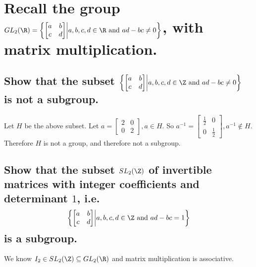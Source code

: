 \section[Problem 4]{
    Recall the group 
    \(
        GL_2(\R) =
        \left \{
        \begin{bmatrix}
            a & b \\
            c & d
        \end{bmatrix}
        \middle |
        a, b, c, d \in \R
        \text{ and }
        ad - bc \neq 0
        \right \}
    \),
    with matrix multiplication.
}
    \subsection[(i)]{
        Show that the subset 
        \(
            \left \{
            \begin{bmatrix}
                a & b \\
                c & d
            \end{bmatrix}
            \middle |
            a, b, c, d \in \Z
            \text{ and }
            ad - bc \neq 0
            \right \}
        \)
        is not a subgroup.
    }
        Let $H$ be the above subset.
        Let \(
            a = 
            \begin{bmatrix}
                2 & 0 \\
                0 & 2
            \end{bmatrix}
            , a \in H
        \).
        So \(
            a^{-1} = 
            \begin{bmatrix}
                \frac{1}{2} & 0 \\
                0 & \frac{1}{2}
            \end{bmatrix}
            , a^{-1} \not\in H
        \).
        Therefore $H$ is not a group, and therefore not a subgroup.

    \subsection[(ii)]{
        Show that the subset $SL_2(\Z)$
        of invertible matrices with integer coefficients and determinant $1$,
        i.e.
        \[
            \left \{
            \begin{bmatrix}
                a & b \\
                c & d
            \end{bmatrix}
            \middle |
            a, b, c, d \in \Z
            \text{ and }
            ad - bc = 1
            \right \}
        \]
        is a subgroup.
    }
        We know $I_2 \in SL_2(\Z) \subseteq GL_2(\R)$ and matrix multiplication is associative.


